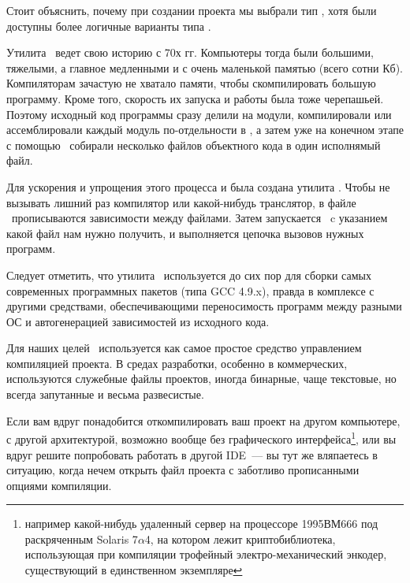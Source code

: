 \label{labmkmake}

Стоит объяснить, почему при создании проекта мы выбрали тип , хотя были доступны более логичные варианты типа .

Утилита \make\ ведет свою историю с 70х гг. Компьютеры тогда были большими,
тяжелыми, а главное медленными и с очень маленькой памятью (всего сотни Кб).
Компиляторам зачастую не хватало памяти, чтобы скомпилировать большую программу.
Кроме того, скорость их запуска и работы была тоже черепашьей.
Поэтому исходный код программы сразу делили на модули, компилировали или
ассемблировали каждый модуль по-отдельности в , а затем уже
на конечном этапе с помощью \ собирали несколько файлов объектного
кода в один исполнямый файл.

Для ускорения и упрощения этого процесса и была создана утилита \make.
Чтобы не вызывать лишний раз компилятор или какой-нибудь транслятор, в файле
\makefile\ прописываются зависимости между файлами. Затем запускается \make\ c
указанием какой файл нам нужно получить, и выполняется цепочка вызовов
нужных программ.

Следует отметить, что утилита \make\ используется до сих пор для сборки самых
современных программных пакетов (типа GCC 4.9.x), правда в комплексе с другими
средствами, обеспечивающими переносимость программ между разными ОС и
автогенерацией зависимостей из исходного кода.

\bigskip
Для наших целей \make\ используется как самое простое средство управлением
компиляцией проекта. В средах разработки, особенно в коммерческих,
используются служебные файлы проектов, иногда бинарные, чаще текстовые, но
всегда запутанные и весьма развесистые.

Если вам вдруг понадобится откомпилировать ваш проект на другом компьютере,
с другой архитектурой, возможно вообще без графического
интерфейса\footnote{например какой-нибудь удаленный сервер на
процессоре 1995ВМ666 под раскряченным Solaris 7$\alpha$4, на котором лежит
криптобиблиотека, использующая при компиляции трофейный электро-механический 
энкодер, существующий в единственном экземпляре \smiley}, или вы вдруг решите
попробовать работать в другой IDE\ --- вы тут же вляпаетесь в ситуацию, 
когда нечем открыть файл проекта с заботливо прописанными опциями
компиляции.

\bigskip
{}


\bigskip



